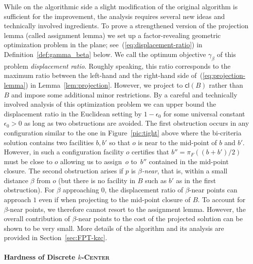 \documentclass[11pt]{article}
\newcommand{\kc}{\textsc{$k$-Center}\xspace}
\begin{document}
While on the algorithmic side a slight modification of the original algorithm is sufficient for the improvement, the analysis requires several new ideas and technically involved ingredients. To prove a strengthened version of the projection lemma (called  assignment lemma) we set up a factor-revealing geometric optimization problem in the plane; see~(\ref{eq:displacement-ratio}) in Definition~\ref{def:gamma_beta} below. We call the optimum objective $\gamma_\beta$ of this problem \emph{displacement ratio}. Roughly speaking, this ratio corresponds to the maximum ratio between the left-hand and the right-hand side of~(\ref{eq:projection-lemma}) in Lemma~\ref{lem:projection}. However, we project to $\textsf{cl}(B)$ rather than $B$ and impose some additional minor restrictions. By a careful and technically involved analysis of this optimization problem we can upper bound the displacement ratio in the Euclidean setting by $1-\epsilon_0$ for some universal constant $\epsilon_0>0$ as long as two obstructions are avoided. The first obstruction occurs in any configuration similar to the one in Figure~\ref{pic:tight} above where the bi-criteria solution contains two facilities $b,b'$ so that $o$ is near to the mid-point of $b$ and $b'$. However, in such a configuration facility $o$ certifies that $b''=\pi_F((b+b')/2)$ must be close to $o$ allowing us to assign~$o$ to~$b''$ contained in the mid-point closure. The second obstruction arises if $p$ is \emph{$\beta$-near}, that is, within a small distance $\beta$ from $o$ (but there is no facility in $B$ such as $b'$ as in the first obstruction). For $\beta$ approaching $0$, the displacement ratio of $\beta$-near points can approach $1$ even if when projecting to the mid-point closure of $B$. To account for $\beta$-near points, we therefore cannot resort to the assignment lemma. However, the overall contribution of $\beta$-near  points to the cost of the projected solution can be shown to be very small. More details of the algorithm and its analysis are provided in Section~\ref{sec:FPT-kzc}. 

\paragraph*{Hardness of Discrete \kc}
\end{document}
